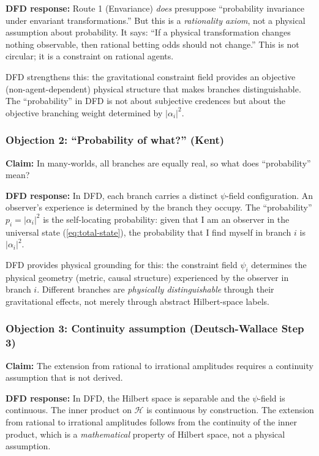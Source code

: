 \documentclass[11pt,a4paper]{article}
\begin{document}
\textbf{DFD response:} Route 1 (Envariance) \emph{does} presuppose ``probability invariance under envariant transformations.'' But this is a \emph{rationality axiom}, not a physical assumption about probability. It says: ``If a physical transformation changes nothing observable, then rational betting odds should not change.'' This is not circular; it is a constraint on rational agents.

DFD strengthens this: the gravitational constraint field provides an objective (non-agent-dependent) physical structure that makes branches distinguishable. The ``probability'' in DFD is not about subjective credences but about the objective branching weight determined by $|\alpha_i|^2$.

\subsubsection{Objection 2: ``Probability of what?'' (Kent)}

\textbf{Claim:} In many-worlds, all branches are equally real, so what does ``probability'' mean?

\textbf{DFD response:} In DFD, each branch carries a distinct $\psi$-field configuration. An observer's experience is determined by the branch they occupy. The ``probability'' $p_i = |\alpha_i|^2$ is the self-locating probability: given that I am an observer in the universal state (\ref{eq:total-state}), the probability that I find myself in branch $i$ is $|\alpha_i|^2$.

DFD provides physical grounding for this: the constraint field $\psi_i$ determines the physical geometry (metric, causal structure) experienced by the observer in branch $i$. Different branches are \emph{physically distinguishable} through their gravitational effects, not merely through abstract Hilbert-space labels.

\subsubsection{Objection 3: Continuity assumption (Deutsch-Wallace Step 3)}

\textbf{Claim:} The extension from rational to irrational amplitudes requires a continuity assumption that is not derived.

\textbf{DFD response:} In DFD, the Hilbert space is separable and the $\psi$-field is continuous. The inner product on $\mathcal{H}$ is continuous by construction. The extension from rational to irrational amplitudes follows from the continuity of the inner product, which is a \emph{mathematical} property of Hilbert space, not a physical assumption.
\end{document}
